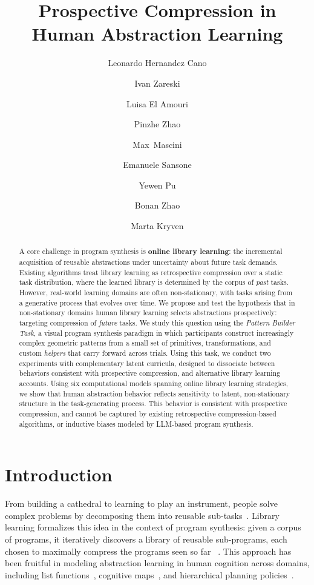 \documentclass{article}
\title{Prospective Compression in Human Abstraction Learning}
\author[1]{Leonardo Hernandez Cano}
\author[2$*$]{Ivan Zareski}
\author[2$*$]{Luisa El Amouri}
\author[3$*$]{Pinzhe Zhao}
\author[2]{Max~Mascini}
\author[1]{Emanuele Sansone}
\author[4]{Yewen Pu}
\author[3$\dagger$]{Bonan Zhao}
\author[2$\dagger$]{Marta Kryven}
\affil[1]{Massachusetts Institute of Technology}
\affil[2]{Dalhousie University}
\affil[3]{University of Edinburgh}
\affil[4]{Nanyang Technological University}
\begin{document}
\maketitle





\begin{abstract}
A core challenge in program synthesis is \textbf{online library
learning}: the incremental acquisition of reusable abstractions under uncertainty about future task demands. Existing algorithms treat library learning as retrospective compression over a static task distribution, where the learned library is determined by the corpus of \textit{past} tasks. 
However, real-world learning domains are often non-stationary, with tasks arising from a generative process that evolves over time.
We propose and test the hypothesis that in non-stationary domains human library learning selects abstractions prospectively: targeting compression of \textit{future} tasks. We study this question using the \textit{Pattern Builder Task}, a visual program synthesis paradigm in which participants construct increasingly complex geometric patterns from a small set of
primitives, transformations, and custom \textit{helpers} that carry forward across trials. Using this task, we conduct two experiments with complementary latent curricula, designed to dissociate between behaviors consistent with prospective compression, and alternative library learning accounts. 
Using six computational models spanning online library learning strategies, we show that human abstraction behavior reflects sensitivity to latent, non-stationary structure in the task-generating process. This behavior is consistent with prospective compression, and cannot be captured by existing retrospective compression-based algorithms, or inductive biases modeled by LLM-based program synthesis.
\end{abstract}



\section{Introduction}


From building a cathedral to learning to play an instrument, people solve complex problems by decomposing them into reusable sub-tasks~\citep{gobet2001chunking,qin2025planning}. 
Library learning formalizes this idea in the context of program synthesis: 
given a corpus of programs, %
it iteratively discovers a library of reusable sub-programs, each chosen to maximally compress the programs seen so far
~\citep{ellis2023dreamcoder,liang2010learning}. 
This approach has been fruitful in modeling abstraction learning in human cognition across domains, including list functions~\citep{liang2010learning,rule2024symbolic}, cognitive maps~\citep{sharma2022mapi,kryven2025cognitive}, and hierarchical planning policies~\citep{correa2025exploring}. 
\end{document}
